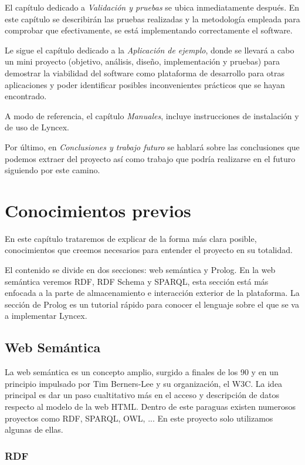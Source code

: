 \documentclass[12pt]{report} %
\begin{document}
El capítulo dedicado a \textit{Validación y pruebas} se ubica inmediatamente después. En este capítulo se describirán las pruebas realizadas y la metodología empleada para comprobar que efectivamente, se está implementando correctamente el software.

Le sigue el capítulo dedicado a la \textit{Aplicación de ejemplo}, donde se llevará a cabo un mini proyecto (objetivo, análisis, diseño, implementación y pruebas) para demostrar la viabilidad del software como plataforma de desarrollo para otras aplicaciones y poder identificar posibles inconvenientes prácticos que se hayan encontrado.

A modo de referencia, el capítulo \textit{Manuales}, incluye instrucciones de instalación y de uso de Lyncex.

Por último, en \textit{Conclusiones y trabajo futuro} se hablará sobre las conclusiones que podemos extraer del proyecto así como trabajo que podría realizarse en el futuro siguiendo por este camino.


\chapter{Conocimientos previos}

En este capítulo trataremos de explicar de la forma más clara posible, conocimientos que creemos necesarios para entender el proyecto en su totalidad.

El contenido se divide en dos secciones: web semántica y Prolog. En la web semántica veremos RDF, RDF Schema y SPARQL, esta sección está más enfocada a la parte de almacenamiento e interacción exterior de la plataforma. La sección de Prolog es un tutorial rápido para conocer el lenguaje sobre el que se va a implementar Lyncex.

\section{Web Semántica}

La web semántica es un concepto amplio\cite{semanticweb}, surgido a finales de los 90 y en un principio impulsado por Tim Berners-Lee y su organización, el W3C. La idea principal es dar un paso cualtitativo más en el acceso y descripción de datos respecto al modelo de la web HTML. Dentro de este paraguas existen numerosos proyectos como RDF\cite{rdf11}, SPARQL\cite{sparql}, OWL\cite{owl}, ... En este proyecto solo utilizamos algunas de ellas.

\subsection{RDF}
\end{document}
